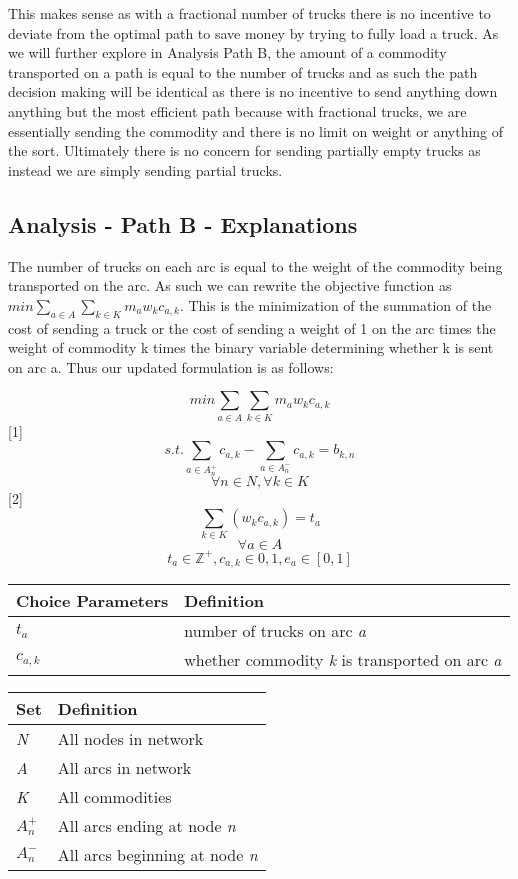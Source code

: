 \documentclass[
]{article}
\begin{document}
This makes sense as with a fractional number of trucks there is no
incentive to deviate from the optimal path to save money by trying to
fully load a truck. As we will further explore in Analysis Path B, the
amount of a commodity transported on a path is equal to the number of
trucks and as such the path decision making will be identical as there
is no incentive to send anything down anything but the most efficient
path because with fractional trucks, we are essentially sending the
commodity and there is no limit on weight or anything of the sort.
Ultimately there is no concern for sending partially empty trucks as
instead we are simply sending partial trucks.

\hypertarget{analysis---path-b---explanations}{%
\subsection{Analysis - Path B -
Explanations}\label{analysis---path-b---explanations}}

The number of trucks on each arc is equal to the weight of the commodity
being transported on the arc. As such we can rewrite the objective
function as \(min\sum_{a∈A}\sum_{k∈K}m_a w_k c_{a,k}\). This is the
minimization of the summation of the cost of sending a truck or the cost
of sending a weight of 1 on the arc times the weight of commodity k
times the binary variable determining whether k is sent on arc a. Thus
our updated formulation is as follows:

\[min\sum_{a∈A}\sum_{k∈K}m_a w_k c_{a,k}\]
{[}1{]}\[s.t. \sum_{a\in A_n^+}c_{a,k} -\sum_{a\in A_n^-}c_{a,k}=b_{k,n}\]
\[\forall n \in N, \forall k \in K\]
{[}2{]}\[\sum_{k\in K}(w_kc_{a,k})=t_a\] \[\forall a \in A\]
\[t_a \in \mathbb{Z}^+, c_{a,k} \in {0,1}, e_a \in [0,1]\]

\begin{longtable}[]{@{}ll@{}}
\toprule
\textbf{Choice Parameters} & \textbf{Definition}\tabularnewline
\midrule
\endhead
\(t_a\) & number of trucks on arc \emph{a}\tabularnewline
\(c_{a,k}\) & whether commodity \emph{k} is transported on arc
\emph{a}\tabularnewline
\bottomrule
\end{longtable}

\begin{longtable}[]{@{}ll@{}}
\toprule
\textbf{Set} & \textbf{Definition}\tabularnewline
\midrule
\endhead
\emph{N} & All nodes in network\tabularnewline
\emph{A} & All arcs in network\tabularnewline
\emph{K} & All commodities\tabularnewline
\(A_n^+\) & All arcs ending at node \emph{n}\tabularnewline
\(A_n^-\) & All arcs beginning at node \emph{n}\tabularnewline
\bottomrule
\end{longtable}
\end{document}
